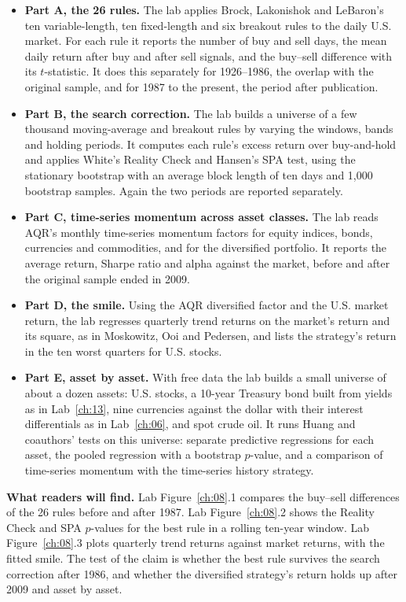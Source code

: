 \begin{itemize}
  \item \textbf{Part A, the 26 rules.} The lab applies Brock, Lakonishok and LeBaron's ten variable-length, ten fixed-length and six breakout rules to the daily U.S. market. For each rule it reports the number of buy and sell days, the mean daily return after buy and after sell signals, and the buy--sell difference with its $t$-statistic. It does this separately for 1926--1986, the overlap with the original sample, and for 1987 to the present, the period after publication.
  \item \textbf{Part B, the search correction.} The lab builds a universe of a few thousand moving-average and breakout rules by varying the windows, bands and holding periods. It computes each rule's excess return over buy-and-hold and applies White's Reality Check and Hansen's SPA test, using the stationary bootstrap with an average block length of ten days and 1,000 bootstrap samples. Again the two periods are reported separately.
  \item \textbf{Part C, time-series momentum across asset classes.} The lab reads AQR's monthly time-series momentum factors for equity indices, bonds, currencies and commodities, and for the diversified portfolio. It reports the average return, Sharpe ratio and alpha against the market, before and after the original sample ended in 2009.
  \item \textbf{Part D, the smile.} Using the AQR diversified factor and the U.S. market return, the lab regresses quarterly trend returns on the market's return and its square, as in Moskowitz, Ooi and Pedersen, and lists the strategy's return in the ten worst quarters for U.S. stocks.
  \item \textbf{Part E, asset by asset.} With free data the lab builds a small universe of about a dozen assets: U.S. stocks, a 10-year Treasury bond built from yields as in Lab~\ref{ch:13}, nine currencies against the dollar with their interest differentials as in Lab~\ref{ch:06}, and spot crude oil. It runs Huang and coauthors' tests on this universe: separate predictive regressions for each asset, the pooled regression with a bootstrap $p$-value, and a comparison of time-series momentum with the time-series history strategy.
\end{itemize}

\textbf{What readers will find.} Lab Figure~\ref{ch:08}.1 compares the buy--sell differences of the 26 rules before and after 1987. Lab Figure~\ref{ch:08}.2 shows the Reality Check and SPA $p$-values for the best rule in a rolling ten-year window. Lab Figure~\ref{ch:08}.3 plots quarterly trend returns against market returns, with the fitted smile. The test of the claim is whether the best rule survives the search correction after 1986, and whether the diversified strategy's return holds up after 2009 and asset by asset.

